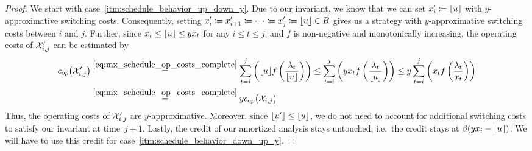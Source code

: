 \begin{proof}
We start with case~\ref{itm:schedule_behavior_up_down_y}. Due to our invariant, we know that we can set $x_i'\coloneqq \lfloor u\rfloor$ with $y$-approximative switching costs. Consequently, setting $x_i'\coloneqq x_{i+1}'\coloneqq\dotsb\coloneqq x_j'\coloneqq \lfloor u\rfloor\in B$ gives us a strategy with $y$-approximative switching costs between $i$ and $j$. Further, since $x_t\le \lfloor u\rfloor\le yx_t$ for any $i\le t\le j$, and $f$ is non-negative and monotonically increasing, the operating costs of $\mathcal{X}'_{i,j}$ can be estimated by
\begin{align*}
	c_{op}\bigl(\mathcal{X}_{i,j}'\bigr)&\stackrel{\eqref{eq:mx_schedule_op_costs_complete}}{=}\sum\limits_{t=i}^j\left(\lfloor u\rfloor f\left(\frac{\lambda_t}{\lfloor u\rfloor}\right)\right)\le\sum\limits_{t=i}^j\left(yx_tf\left(\frac{\lambda_t}{\lfloor u\rfloor}\right)\right)\le y\sum\limits_{t=i}^j\left(x_tf\left(\frac{\lambda_t}{x_t}\right)\right)\\
	&\stackrel{\eqref{eq:mx_schedule_op_costs_complete}}{=}yc_{op}\bigl(\mathcal{X}_{i,j}\bigr)
\end{align*}
Thus, the operating costs of $\mathcal{X}_{i,j}'$ are $y$-approximative. Moreover, since $\lfloor u'\rfloor\le\lfloor u\rfloor$, we do not need to account for additional switching costs to satisfy our invariant at time~$j+1$. Lastly, the credit of our amortized analysis stays untouched, i.e.\ the credit stays at $\beta(yx_i-\lfloor u\rfloor)$. We will have to use this credit for case~\ref{itm:schedule_behavior_down_up_y}.


\end{proof}
